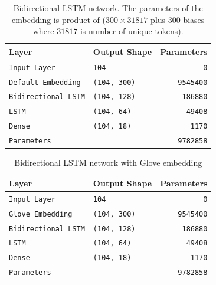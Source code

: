 \documentclass[sigconf, nonacm, natbib, screen, balance=False]{acmart}
\begin{document}
\begin{table}
  \caption{Bidirectional LSTM network. The parameters of the embedding is product of ($300 \times 31817$ plus $300$ biases where $31817$ is number of unique tokens).}
  \label{tbl:rnn_used}
  \begin{tabular}{l|l|r}  
    \hline
    Layer & Output Shape & Parameters \\\hline
    \verb!Input Layer! & \verb!104! & \verb!0! \\
    \verb!Default Embedding! & \verb!(104, 300)! & \verb!9545400! \\
    \verb!Bidirectional LSTM! & \verb!(104, 128)! & \verb!186880!\\
    \verb!LSTM! & \verb!(104, 64)! & \verb!49408!\\
    \verb!Dense! & \verb!(104, 18)! & \verb!1170! \\
    \verb!Parameters! & \verb!! & \verb!9782858!  \\\hline
  \end{tabular}
\end{table}

\begin{table}
  \caption{Bidirectional LSTM network with Glove embedding}
  \label{tbl:rnn_glove}
  \begin{tabular}{l|l|r}  
    \hline
    Layer & Output Shape & Parameters \\\hline
    \verb!Input Layer! & \verb!104! & \verb!0! \\
    \verb!Glove Embedding! & \verb!(104, 300)! & \verb!9545400! \\
    \verb!Bidirectional LSTM! & \verb!(104, 128)! & \verb!186880!\\
    \verb!LSTM! & \verb!(104, 64)! & \verb!49408!\\
    \verb!Dense! & \verb!(104, 18)! & \verb!1170! \\
    \verb!Parameters! & \verb!! & \verb!9782858!  \\\hline
  \end{tabular}
\end{table}

\hfill\\
\end{document}
